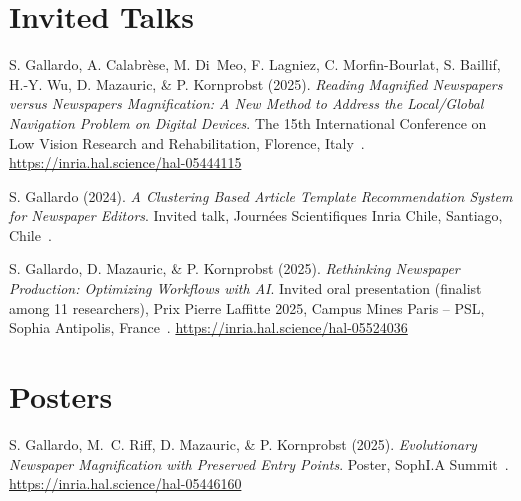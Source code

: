 \documentclass{these-ISSS} %
\begin{document}
\section*{Invited Talks}
\begin{callout}
S. Gallardo, A. Calabr\`ese, M. Di~Meo, F. Lagniez, C. Morfin-Bourlat, S. Baillif, H.-Y. Wu, D. Mazauric, \& P. Kornprobst (2025). \emph{Reading Magnified Newspapers versus Newspapers Magnification: A New Method to Address the Local/Global Navigation Problem on Digital Devices}. The 15th International Conference on Low Vision Research and Rehabilitation, Florence, Italy~. \url{https://inria.hal.science/hal-05444115}

S. Gallardo (2024). \emph{A Clustering Based Article Template Recommendation System for Newspaper Editors}. Invited talk, Journ\'ees Scientifiques Inria Chile, Santiago, Chile~.

S. Gallardo, D. Mazauric, \& P. Kornprobst (2025). \emph{Rethinking Newspaper Production: Optimizing Workflows with AI}. Invited oral presentation (finalist among 11 researchers), Prix Pierre Laffitte 2025, Campus Mines Paris -- PSL, Sophia Antipolis, France~. \url{https://inria.hal.science/hal-05524036}
\end{callout}

\section*{Posters}
\begin{callout}
S. Gallardo, M.~C. Riff, D. Mazauric, \& P. Kornprobst (2025). \emph{Evolutionary Newspaper Magnification with Preserved Entry Points}. Poster, SophI.A Summit~. \url{https://inria.hal.science/hal-05446160}
\end{callout}







\appendix

\end{document}
